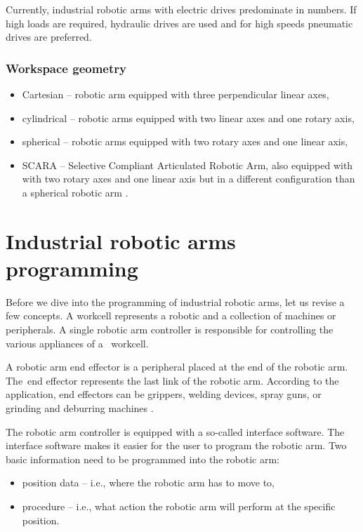 Currently, industrial robotic arms with electric drives predominate in numbers. If high loads are required, hydraulic drives are used and for high speeds pneumatic drives are preferred.

\subsubsection*{Workspace geometry}

\begin{itemize}
    \item Cartesian -- robotic arm equipped with three perpendicular linear axes,
    \item cylindrical -- robotic arms equipped with two linear axes and one rotary axis,
    \item spherical --  robotic arms equipped with two rotary axes and one linear axis,
    \item SCARA -- Selective Compliant Articulated Robotic Arm, also equipped with with two rotary axes and one linear axis but in a different configuration than a spherical robotic arm \cite{vsb_2007}.
\end{itemize}

\section{Industrial robotic arms programming}

Before we dive into the programming of industrial robotic arms, let us revise a few concepts.
A workcell represents a robotic and a collection of machines or peripherals. A single robotic arm controller is responsible for controlling the various appliances of a~ workcell.

A robotic arm end effector is a peripheral placed at the end of the robotic arm. The~end effector represents the last link of the robotic arm. According to the application, end effectors can be grippers, welding devices, spray guns, or grinding and deburring machines \cite{monkman_2007}.

The robotic arm controller is equipped with a so-called interface software. The interface software makes it easier for the user to program the robotic arm. Two basic information need to be programmed into the robotic arm:

\begin{itemize}
    \item position data -- i.e., where the robotic arm has to move to,
    \item procedure -- i.e., what action the robotic arm will perform at the specific position.
\end{itemize}

